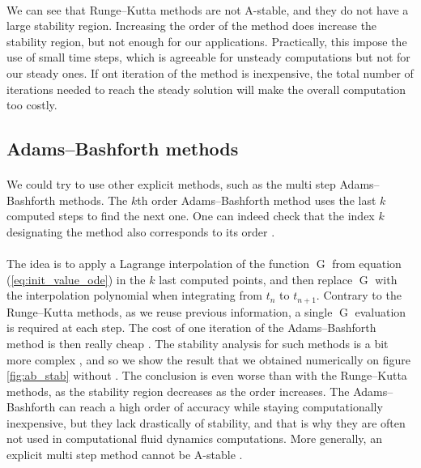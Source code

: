         \paragraph{}
        We can see that Runge--Kutta methods are not A-stable, and they do not have a large stability region.
        Increasing the order of the method does increase the stability region, but not enough for our applications.
        Practically, this impose the use of small time steps, which is agreeable for unsteady computations but not for our steady ones.
        If ont iteration of the method is inexpensive, the total number of iterations needed to reach the steady solution will make the overall computation too costly.


      \subsection{Adams--Bashforth methods}

        \paragraph{}
        We could try to use other explicit methods, such as the multi step Adams--Bashforth methods.
        The $k$th order Adams--Bashforth method uses the last $k$ computed steps to find the next one.
        One can indeed check that the index $k$ designating the method also corresponds to its order \cite{HairerNorsettWanner1993}.

        \paragraph{}
        The idea is to apply a Lagrange interpolation of the function $\operatorname{G}$ from equation (\ref{eq:init_value_ode}) in the $k$ last computed points, and then replace $\operatorname{G}$ with the interpolation polynomial when integrating from $t_n$ to $t_{n+1}$.
        Contrary to the Runge--Kutta methods, as we reuse previous information, a single $\operatorname{G}$ evaluation is required at each step.
        The cost of one iteration of the Adams--Bashforth method is then really cheap .
        The stability analysis for such methods is a bit more complex \cite{HairerNorsettWanner1993, HairerWanner1996}, and so we show the result that we obtained numerically on figure \ref{fig:ab_stab} without .
        The conclusion is even worse than with the Runge--Kutta methods, as the stability region decreases as the order increases.
        The Adams--Bashforth can reach a high order of accuracy while staying computationally inexpensive, but they lack drastically of stability, and that is why they are often not used in computational fluid dynamics computations.
        More generally, an explicit multi step method cannot be A-stable \cite{Dahlquist1963}.

